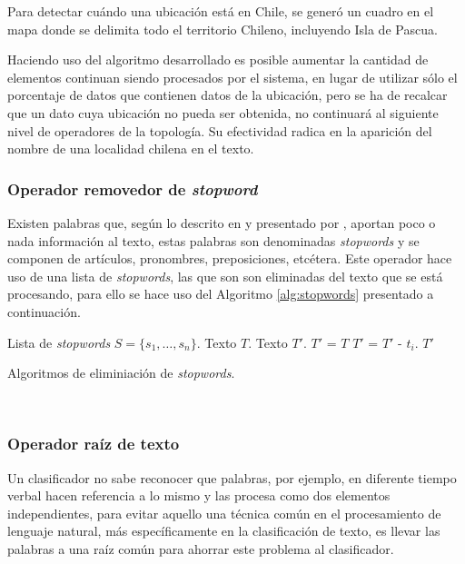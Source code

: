 Para detectar cuándo una ubicación está en Chile, se generó un cuadro en el mapa donde se delimita todo el territorio Chileno, incluyendo Isla de Pascua.

Haciendo uso del algoritmo desarrollado es posible aumentar la cantidad de elementos continuan siendo procesados por el sistema, en lugar de utilizar sólo el porcentaje de datos que contienen datos de la ubicación, pero se ha de recalcar que un dato cuya ubicación no pueda ser obtenida, no continuará al siguiente nivel de operadores de la topología. Su efectividad radica en la aparición del nombre de una localidad chilena en el texto.

\subsubsection*{Operador removedor de \textit{stopword}}
\label{subsubsec:5op}

Existen palabras que, según lo descrito en \cite{IRQE} y presentado por \cite{JustifStopStemm}, aportan poco o nada información al texto, estas palabras son denominadas \textit{stopwords} y se componen de artículos, pronombres, preposiciones, etcétera. Este operador hace uso de una lista de \textit{stopwords}, las que son son eliminadas del texto que se está procesando, para ello se hace uso del Algoritmo \ref{alg:stopwords} presentado a continuación.\\

\begin{algorithm}[H]
	\begin{algorithmic}
		\REQUIRE Lista de \textit{stopwords} $S=\{s_{1}, \dots, s_{n} \}$.
		\REQUIRE Texto $T$.
		\ENSURE Texto $T'$.
		\STATE $T'$ = $T$
			\STATE $T'$ = $T'$ - $t_{i}$. 
			\ENDIF
		\ENDFOR
		\RETURN $T'$
	\end{algorithmic}
	\caption{Algoritmos de eliminiación de \textit{stopwords}.}
	\label{alg:stopwords}
\end{algorithm}\vphantom\\

\subsubsection*{Operador raíz de texto}
\label{subsubsec:6op}

Un clasificador no sabe reconocer que palabras, por ejemplo, en diferente tiempo verbal hacen referencia a lo mismo y las procesa como dos elementos independientes, para evitar aquello una técnica común en el procesamiento de lenguaje natural, más específicamente en la clasificación de texto, es llevar las palabras a una raíz común para ahorrar este problema al clasificador.

